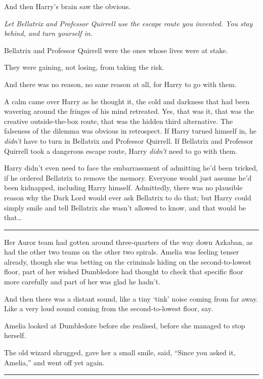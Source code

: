 And then Harry's brain saw the obvious.

\emph{Let Bellatrix and Professor Quirrell use the escape route you
invented. You stay behind, and turn yourself in.}

Bellatrix and Professor Quirrell were the ones whose lives were at
stake.

They were gaining, not losing, from taking the risk.

And there was no reason, no sane reason at all, for Harry to go with
them.

A calm came over Harry as he thought it, the cold and darkness that had
been wavering around the fringes of his mind retreated. Yes, that was
it, that was the creative outside-the-box route, that was the hidden
third alternative. The falseness of the dilemma was obvious in
retrospect. If Harry turned himself in, he \emph{didn't} have to turn in
Bellatrix and Professor Quirrell. If Bellatrix and Professor Quirrell
took a dangerous escape route, Harry \emph{didn't} need to go with them.

Harry didn't even need to face the embarrassment of admitting he'd been
tricked, if he ordered Bellatrix to remove the memory. Everyone would
just assume he'd been kidnapped, including Harry himself. Admittedly,
there was no plausible reason why the Dark Lord would ever ask Bellatrix
to do that; but Harry could simply smile and tell Bellatrix she wasn't
allowed to know, and that would be that\ldots{}

\begin{center}\rule{3in}{0.4pt}\end{center}

Her Auror team had gotten around three-quarters of the way down Azkaban,
as had the other two teams on the other two spirals. Amelia was feeling
tenser already, though she was betting on the criminals hiding on the
second-to-lowest floor, part of her wished Dumbledore had thought to
check that specific floor more carefully and part of her was glad he
hadn't.

And then there was a distant sound, like a tiny `tink' noise coming from
far away. Like a very loud sound coming from the second-to-lowest floor,
say.

Amelia looked at Dumbledore before she realised, before she managed to
stop herself.

The old wizard shrugged, gave her a small smile, said, ``Since you asked
it, Amelia,'' and went off yet again.

\begin{center}\rule{3in}{0.4pt}\end{center}

